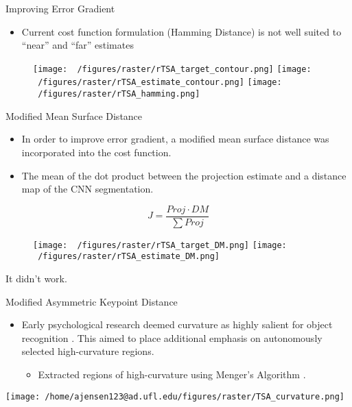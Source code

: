 \documentclass[presentation, aspectratio=1610]{beamer}
\begin{document}
\begin{frame}[label={sec:orga66f3e4}]{Improving Error Gradient}
\begin{itemize}
\item Current cost function formulation (Hamming Distance) is not well suited to ``near'' and ``far'' estimates
\end{itemize}
\begin{figure}[h!]
	\centering
	\texttt{[image: ~/figures/raster/rTSA\_target\_contour.png]}
	\texttt{[image: ~/figures/raster/rTSA\_estimate\_contour.png]}
	\texttt{[image: ~/figures/raster/rTSA\_hamming.png]}
\end{figure}
\end{frame}
\begin{frame}[label={sec:org8991535}]{Modified Mean Surface Distance}
\begin{itemize}
\item In order to improve error gradient, a modified mean surface distance was incorporated into the cost function.
\item The mean of the dot product between the projection estimate and a distance map of the CNN segmentation.
\end{itemize}
\begin{equation}
  \label{eq:DMCF}
  J = \dfrac{Proj \cdot DM}{\sum Proj}
\end{equation}

\begin{figure}[h!]
	\centering
	\texttt{[image: ~/figures/raster/rTSA\_target\_DM.png]}
	\texttt{[image: ~/figures/raster/rTSA\_estimate\_DM.png]}
\end{figure}
\vspace{-5mm}
{\tiny It didn't work.}
\end{frame}
\begin{frame}[label={sec:orgb6217fd}]{Modified Asymmetric Keypoint Distance}
\begin{itemize}
\item Early psychological research deemed curvature as highly salient for object recognition \autocites{attneaveInformationalAspectsVisual1954}[][]{attneaveQuantitativeStudyShape1956}. This aimed to place additional emphasis on autonomously selected high-curvature regions.
\begin{itemize}
\item Extracted regions of high-curvature using Menger's Algorithm \autocite{legerMengerCurvatureRectifiability1999}.
\end{itemize}
\end{itemize}

\begin{center}
\texttt{[image: /home/ajensen123@ad.ufl.edu/figures/raster/TSA\_curvature.png]}
\end{center}
\end{frame}
\end{document}
